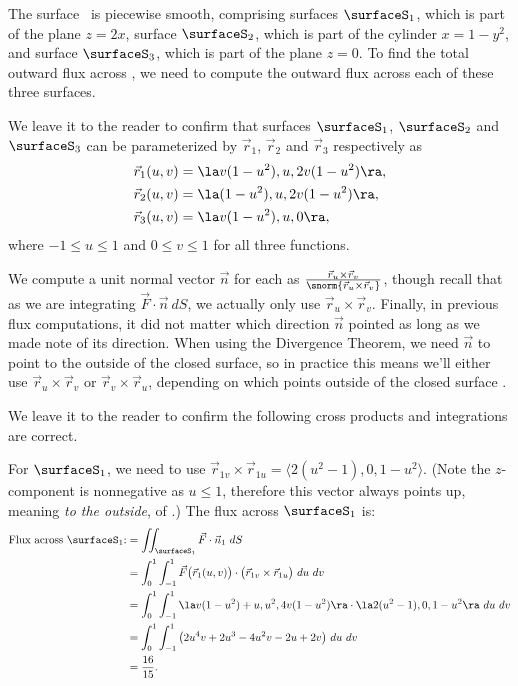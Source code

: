 {The surface \surfaceS\ is piecewise smooth, comprising surfaces $\surfaceS_1$, which is part of the plane $z=2x$, surface $\surfaceS_2$, which is part of the cylinder $x=1-y^2$, and surface $\surfaceS_3$, which is part of the plane $z=0$. To find the total outward flux across \surfaceS, we need to compute the outward flux across each of these three surfaces.

We leave it to the reader to confirm that surfaces $\surfaceS_1$, $\surfaceS_2$ and $\surfaceS_3$ can be parameterized by $\vec r_1$, $\vec r_2$ and $\vec r_3$ respectively as
\begin{align*}
\vec r_1(u,v) &= \la v(1-u^2), u, 2v(1-u^2)\ra, \\
\vec r_2(u,v) &= \la (1-u^2), u, 2v(1-u^2)\ra,\\
\vec r_3(u,v) &= \la v(1-u^2), u, 0\ra,
\end{align*}
where $-1\leq u\leq 1$ and $0\leq v\leq 1$ for all three functions.

We compute a unit normal vector $\vec n$ for each as $\frac{\vec r_u\times\vec r_v}{\snorm{\vec r_u\times\vec r_v}}$, though recall that as we are integrating $\vec F\cdot \vec n\ dS$, we actually only use $\vec r_u\times\vec r_v$. Finally, in previous flux computations, it did not matter which direction $\vec n$ pointed as long as we made note of its direction. When using the Divergence Theorem, we need $\vec n$ to point to the outside of the closed surface, so in practice this means we'll either use $\vec r_u\times\vec r_v$ or $\vec r_v\times\vec r_u$, depending on which points outside of the closed surface \surfaceS.

We leave it to the reader to confirm the following cross products and integrations are correct.
\drawexampleline

For $\surfaceS_1$, we need to use $\vec r_{1v}\times\vec r_{1u} = \langle 2(u^2-1),0,1-u^2\rangle$. (Note the $z$-component is nonnegative as $u\leq 1$, therefore this vector always points up, meaning \emph{to the outside}, of \surfaceS.) The flux across $\surfaceS_1$ is:
\begin{align*}
\text{Flux across $\surfaceS_1$:} &= \iint_{\surfaceS_1} \vec F\cdot \vec n_1\ dS \\
		&= \int_0^1\int_{-1}^1 \vec F\big(\vec r_1(u,v)\big)\cdot \big(\vec r_{1v}\times\vec r_{1u}\big)\ du\ dv\\
		&= \int_0^1\int_{-1}^1 \la v(1-u^2)+u, u^2,4v(1-u^2)\ra \cdot \la 2(u^2-1),0,1-u^2\ra\ du\ dv\\
		&= \int_0^1\int_{-1}^1 \big(2u^4v+2u^3-4u^2v-2u+2v\big)\ du\ dv\\
		&= \frac{16}{15}.
\end{align*}

}
